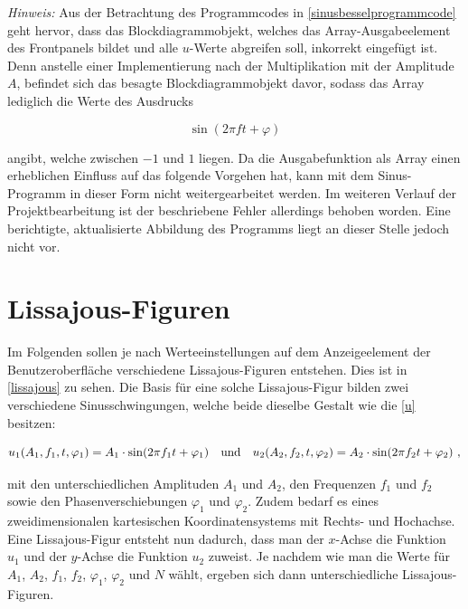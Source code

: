 \documentclass[
a4paper,
12pt,
pagesize,
ngerman
]{scrartcl}
\begin{document}
	\emph{Hinweis:} Aus der Betrachtung des Programmcodes in \cref{sinusbesselprogrammcode} geht hervor, dass das Blockdiagrammobjekt, welches das Array-Ausgabeelement des Frontpanels bildet und alle $u$-Werte abgreifen soll, inkorrekt eingefügt ist. Denn anstelle einer Implementierung nach der Multiplikation mit der Amplitude $A$, befindet sich das besagte Blockdiagrammobjekt davor, sodass das Array lediglich die Werte des Ausdrucks
	
	\begin{equation}
	\sin(2\pi f t + \varphi)
	\end{equation}
	
	\noindent angibt, welche zwischen $-1$ und $1$ liegen. Da die Ausgabefunktion als Array einen erheblichen Einfluss auf das folgende Vorgehen hat, kann mit dem Sinus-Programm in dieser Form nicht weitergearbeitet werden. Im weiteren Verlauf der Projektbearbeitung ist der beschriebene Fehler allerdings behoben worden. Eine berichtigte, aktualisierte Abbildung des Programms liegt an dieser Stelle jedoch nicht vor.
	\label{sinus_amp_fehler}
	
	\newpage
	
	
	\section{Lissajous-Figuren}
	
	Im Folgenden sollen je nach Werteeinstellungen auf dem Anzeigeelement der Benutzeroberfläche verschiedene Lissajous-Figuren entstehen. Dies ist in \cref{lissajous} zu sehen. Die Basis für eine solche Lissajous-Figur bilden zwei verschiedene Sinusschwingungen, welche beide dieselbe Gestalt wie die \cref{u} besitzen:
	
	\begin{equation} \label{u1u2}
	u_1(A_1,f_1,t,\varphi_1) = A_1 \cdot \sin(2\pi f_1 t + \varphi_1) \ \ \ \textnormal{und} \ \ \ u_2(A_2,f_2,t,\varphi_2) = A_2 \cdot \sin(2\pi f_2 t + \varphi_2) \ ,
	\end{equation}
	
	\noindent mit den unterschiedlichen Amplituden $A_1$ und $A_2$, den Frequenzen $f_1$ und $f_2$ sowie den Phasenverschiebungen $\varphi_1$ und $\varphi_2$. Zudem bedarf es eines zweidimensionalen kartesischen Koordinatensystems mit Rechts- und Hochachse. Eine Lissajous-Figur entsteht nun dadurch, dass man der $x$-Achse die Funktion $u_1$ und der $y$-Achse die Funktion $u_2$ zuweist. Je nachdem wie man die Werte für $A_1$, $A_2$, $f_1$, $f_2$, $\varphi_1$, $\varphi_2$ und $N$ wählt, ergeben sich dann unterschiedliche Lissajous-Figuren.
	
\end{document}
